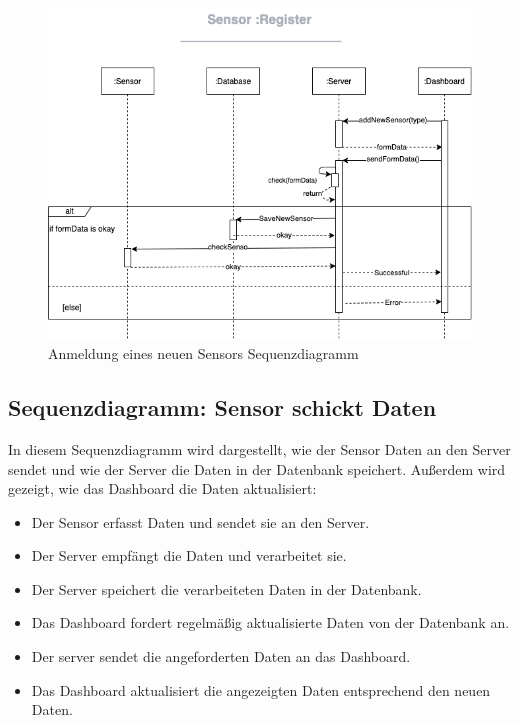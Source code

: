 \begin{figure}[htbp]
	\centering
	\includegraphics[width=1\textwidth]{img/register_sequence_Diagramm.png}
	\caption{Anmeldung eines neuen Sensors Sequenzdiagramm}
\end{figure}
\clearpage

\subsection{Sequenzdiagramm: Sensor schickt Daten}\label{appendix:b4}\par

In diesem Sequenzdiagramm wird dargestellt, wie der Sensor Daten an den Server sendet und wie der Server die Daten in der Datenbank speichert. Außerdem wird gezeigt, wie das Dashboard die Daten aktualisiert:
\begin{itemize}
	\item Der Sensor erfasst Daten und sendet sie an den Server.
	\item Der Server empfängt die Daten und verarbeitet sie.
	\item Der Server speichert die verarbeiteten Daten in der Datenbank.
	\item Das Dashboard fordert regelmäßig aktualisierte Daten von der Datenbank an.
	\item Der server sendet die angeforderten Daten an das Dashboard.
	\item Das Dashboard aktualisiert die angezeigten Daten entsprechend den neuen Daten.
\end{itemize}

